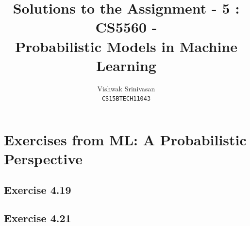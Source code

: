 \documentclass{article}
\title{Solutions to the Assignment - 5 : CS5560 - \\
Probabilistic Models in Machine Learning}
\author{Vishwak Srinivasan\\
\texttt{CS15BTECH11043}}
\date{}
\begin{document}
\maketitle

\section*{Exercises from ML: A Probabilistic Perspective}
\subsection*{Exercise 4.19}
\begin{flushleft}
\end{flushleft}

\subsection*{Exercise 4.21}
\end{document}
